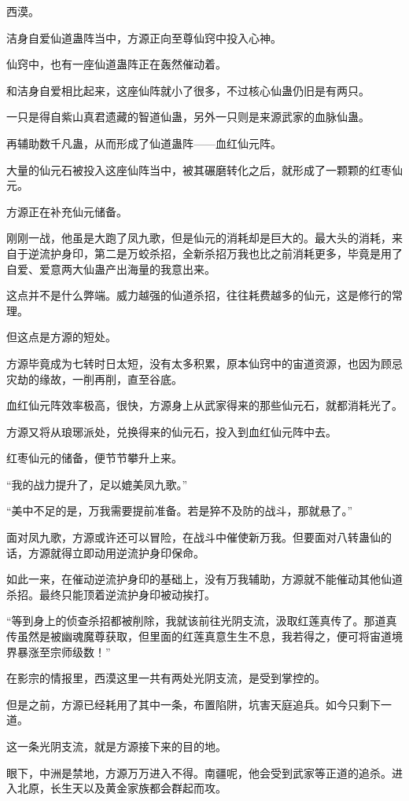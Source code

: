 \begin{this_body}
西漠。

洁身自爱仙道蛊阵当中，方源正向至尊仙窍中投入心神。

仙窍中，也有一座仙道蛊阵正在轰然催动着。

和洁身自爱相比起来，这座仙阵就小了很多，不过核心仙蛊仍旧是有两只。

一只是得自紫山真君遗藏的智道仙蛊，另外一只则是来源武家的血脉仙蛊。

再辅助数千凡蛊，从而形成了仙道蛊阵——血红仙元阵。

大量的仙元石被投入这座仙阵当中，被其碾磨转化之后，就形成了一颗颗的红枣仙元。

方源正在补充仙元储备。

刚刚一战，他虽是大跑了凤九歌，但是仙元的消耗却是巨大的。最大头的消耗，来自于逆流护身印，第二是万蛟杀招，全新杀招万我也比之前消耗更多，毕竟是用了自爱、爱意两大仙蛊产出海量的我意出来。

这点并不是什么弊端。威力越强的仙道杀招，往往耗费越多的仙元，这是修行的常理。

但这点是方源的短处。

方源毕竟成为七转时日太短，没有太多积累，原本仙窍中的宙道资源，也因为顾忌灾劫的缘故，一削再削，直至谷底。

血红仙元阵效率极高，很快，方源身上从武家得来的那些仙元石，就都消耗光了。

方源又将从琅琊派处，兑换得来的仙元石，投入到血红仙元阵中去。

红枣仙元的储备，便节节攀升上来。

“我的战力提升了，足以媲美凤九歌。”

“美中不足的是，万我需要提前准备。若是猝不及防的战斗，那就悬了。”

面对凤九歌，方源或许还可以冒险，在战斗中催使新万我。但要面对八转蛊仙的话，方源就得立即动用逆流护身印保命。

如此一来，在催动逆流护身印的基础上，没有万我辅助，方源就不能催动其他仙道杀招。最终只能顶着逆流护身印被动挨打。

“等到身上的侦查杀招都被削除，我就该前往光阴支流，汲取红莲真传了。那道真传虽然是被幽魂魔尊获取，但里面的红莲真意生生不息，我若得之，便可将宙道境界暴涨至宗师级数！”

在影宗的情报里，西漠这里一共有两处光阴支流，是受到掌控的。

但是之前，方源已经耗用了其中一条，布置陷阱，坑害天庭追兵。如今只剩下一道。

这一条光阴支流，就是方源接下来的目的地。

眼下，中洲是禁地，方源万万进入不得。南疆呢，他会受到武家等正道的追杀。进入北原，长生天以及黄金家族都会群起而攻。


\end{this_body}
